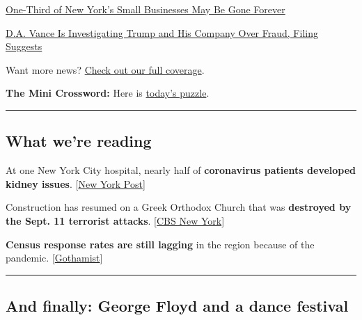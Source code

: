 \href{https://www.nytimes3xbfgragh.onion/2020/08/03/nyregion/nyc-small-businesses-closing-coronavirus.html}{One-Third
of New York's Small Businesses May Be Gone Forever}

\href{https://www.nytimes3xbfgragh.onion/2020/08/03/nyregion/donald-trump-taxes-cyrus-vance.html}{D.A.
Vance Is Investigating Trump and His Company Over Fraud, Filing
Suggests}

Want more news?
\href{https://www.nytimes3xbfgragh.onion/section/nyregion}{Check out our
full coverage}.

\textbf{The Mini Crossword:} Here is
\href{https://www.nytimes3xbfgragh.onion/crosswords/game/mini}{today's
puzzle}.

\begin{center}\rule{0.5\linewidth}{\linethickness}\end{center}

\hypertarget{what-were-reading}{%
\subsection{What we're reading}\label{what-were-reading}}

At one New York City hospital, nearly half of \textbf{coronavirus
patients developed kidney issues}.
{[}\href{https://nypost.com/2020/08/03/half-of-coronavirus-patients-at-nyc-hospital-developed-kidney-issues/}{New
York Post}{]}

Construction has resumed on a Greek Orthodox Church that was
\textbf{destroyed by the Sept. 11 terrorist attacks}.
{[}\href{https://newyork.cbslocal.com/2020/08/03/construction-resumes-to-rebuild-historic-greek-orthodox-church-destroyed-on-9-11/}{CBS
New York}{]}

\textbf{Census response rates are still lagging} in the region because
of the pandemic.
{[}\href{https://gothamist.com/news/nyc-census-response-rate-continues-lag-city-grapples-pandemic-fears-and-reduced-door-knocking}{Gothamist}{]}

\begin{center}\rule{0.5\linewidth}{\linethickness}\end{center}

\hypertarget{and-finally-george-floyd-and-a-dance-festival}{%
\subsection{And finally: George Floyd and a dance
festival}\label{and-finally-george-floyd-and-a-dance-festival}}

